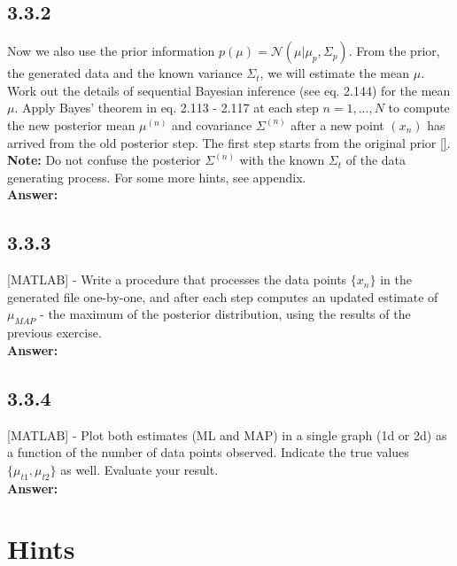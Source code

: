 \documentclass[a4paper]{article}
\begin{document}
\subsection*{3.3.2}


Now we also use the prior information $p(\mu) = \mathcal{N}(\mu | \mu_p, \Sigma_p)$. From the prior, the generated data and the known variance $\Sigma_t$, we will estimate the mean $\mu$.\\

Work out the details of sequential Bayesian inference (see eq. 2.144) for the mean $\mu$. Apply Bayes' theorem in eq. 2.113 - 2.117 at each step $n = 1, ..., N$ to compute the new posterior mean $\mu^{(n)}$ and covariance $\Sigma^{(n)}$ after a new point $(x_n)$ has arrived from the old posterior step. The first step starts from the original prior \ref{}.\\
\textbf{Note:} Do not confuse the posterior $\Sigma^{(n)}$ with the known $\Sigma_t$ of the data generating process. For some more hints, see appendix.\\

\textbf{Answer:}\\


\subsection*{3.3.3}

[MATLAB] - Write a procedure that processes the data points $\{ x_n\}$ in the generated file one-by-one, and after each step computes an updated estimate of $\mu_{MAP}$ - the maximum of the posterior distribution, using the results of the previous exercise.\\


\textbf{Answer:}\\


\subsection*{3.3.4}

[MATLAB] - Plot both estimates (ML and MAP) in a single graph (1d or 2d) as a function of the number of data points observed. Indicate the true values $\{ \mu_{t1}, \mu_{t2}\}$ as well. Evaluate your result.\\

\textbf{Answer:}\\

\section*{Hints}
\end{document}
